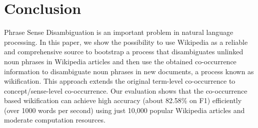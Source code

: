 \section{Conclusion}
\label{sec:conclude}
Phrase Sense Disambiguation is an important problem in
natural language processing.
In this paper, we show the possibility to use Wikipedia
as a reliable and comprehensive source to bootstrap a process that
disambiguates unlinked noun phrases
in Wikipedia articles and then use the obtained co-occurrence
information to disambiguate noun phrases in new documents,
a process known as wikification. This approach extends the original
term-level co-occurrence to concept/sense-level co-occurrence.
Our evaluation shows that the co-occurrence based wikification can achieve
high accuracy (about 82.58\% on F1) efficiently (over 1000 words per second)
using just 10,000 popular
Wikipedia articles and moderate computation resources.
